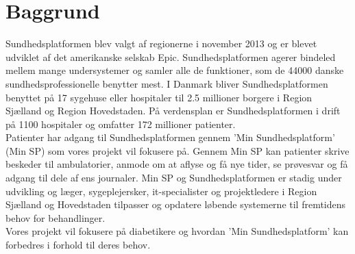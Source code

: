\section{Baggrund}
Sundhedsplatformen blev valgt af regionerne i november 2013 og er blevet udviklet af det amerikanske selskab Epic. Sundhedsplatformen agerer bindeled mellem mange undersystemer og samler alle de funktioner, som de 44000 danske sundhedsprofessionelle benytter mest. I Danmark bliver Sundhedsplatformen benyttet på 17 sygehuse eller hospitaler til 2.5 millioner borgere i Region Sjælland og Region Hovedstaden. På verdensplan er Sundhedsplatformen i drift på 1100 hospitaler og omfatter 172 millioner patienter.\\
Patienter har adgang til Sundhedsplatformen gennem 'Min Sundhedsplatform' (Min SP) som vores projekt vil fokusere på. Gennem Min SP kan patienter skrive beskeder til ambulatorier, anmode om at aflyse og få nye tider, se prøvesvar og få adgang til dele af ens journaler. Min SP og Sundhedsplatformen er stadig under udvikling og læger, sygeplejersker, it-specialister og projektledere i Region Sjælland og Hovedstaden tilpasser og opdatere løbende systemerne til fremtidens behov for behandlinger.\\
Vores projekt vil fokusere på diabetikere og hvordan 'Min Sundhedsplatform' kan forbedres i forhold til deres behov.
